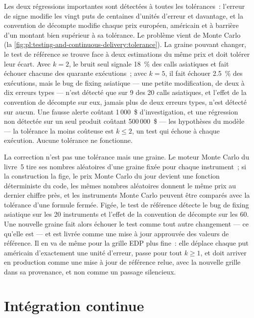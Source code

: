 Les deux régressions importantes sont détectées à toutes les tolérances~: l'erreur de signe modifie les vingt puts de centaines d'unités d'erreur et davantage, et la convention de
décompte modifie chaque prix européen, américain et à barrière d'un montant bien supérieur à sa tolérance. Le problème vient de Monte Carlo
(la \cref{fig:pl:testing-and-continuous-delivery:tolerance}). La graine pouvant changer, le test de référence se trouve face à deux estimations du même prix
et doit tolérer leur écart. Avec $k=2$, le bruit seul signale 18~\% des calls asiatiques et fait échouer chacune des quarante exécutions~; avec $k=5$, il fait échouer 2.5~\%
des exécutions, mais le bug de fixing asiatique --- une petite modification, de deux à dix erreurs types --- n'est détecté que sur 9 des 20 calls asiatiques, et l'effet de la
convention de décompte sur eux, jamais plus de deux erreurs types, n'est détecté sur aucun. Une fausse alerte coûtant 1\,000~\$ d'investigation, et une régression
non détectée sur un seul produit coûtant 500\,000~\$ --- les hypothèses du modèle --- la tolérance la moins coûteuse est $k\le2$, un test qui échoue à chaque exécution. Aucune tolérance ne fonctionne.

La correction n'est pas une tolérance mais une graine. Le moteur Monte Carlo du livre~5 tire ses nombres aléatoires d'une graine fixée pour chaque instrument~; si la construction
la fige, le prix Monte Carlo du jour devient une fonction déterministe du code, les mêmes nombres aléatoires donnent le même prix au dernier chiffre près,
et les instruments Monte Carlo peuvent être comparés avec la tolérance d'une formule fermée. Figée, le test de référence détecte le bug de fixing asiatique sur les 20
instruments et l'effet de la convention de décompte sur les 60. Une nouvelle graine fait alors échouer le test comme tout autre changement --- ce qu'elle est --- et est livrée comme une
mise à jour approuvée des valeurs de référence. Il en va de même pour la grille EDP plus fine~: elle déplace chaque put américain d'exactement une unité d'erreur, passe
pour tout $k\ge1$, et doit arriver en production comme une mise à jour de référence relue, avec la nouvelle grille dans sa provenance, et non comme un passage silencieux.

\section{Intégration continue}

